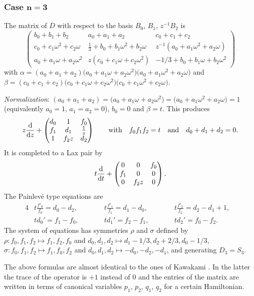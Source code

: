 \documentclass[10pt,a4paper]{amsart}
\numberwithin{equation}{section}
\begin{document}
\subsubsection[Case n=3]{Case $\boldsymbol{n=3}$}
The matrix of $D$ with respect to the basis $B_0$, $B_1$, $z^{-1}B_2$ is
\[\begin{pmatrix} b_0+b_1+b_2 & a_0+a_1+a_2 & c_0+c_1+c_2 \\
 c_0+c_1\omega ^2 +c_2\omega &\frac{1}{3}+b_0+b_1\omega^2+b_2\omega
 & z^{-1}(a_0+a_1\omega^2+a_2\omega ) \\
a_0+a_1\omega+a_2\omega^2 & z(c_0+c_1\omega+c_2\omega ^2)& -1/3+b_0+b_1\omega +b_2\omega^2
\end{pmatrix} \]
with $\alpha =(a_0+a_1+a_2)\bigl(a_0+a_1\omega +a_2\omega ^2\bigr)\bigl(a_0+a_1\omega^2+a_2\omega\bigr)$ and
 $\beta=(c_0+c_1+c_2)\bigl(c_0+c_1\omega +c_2\omega ^2\bigr)\bigl(c_0+c_1\omega^2+c_2\omega\bigr)$.

 {\it Normalization}: $(a_0+a_1+a_2)=\bigl(a_0+a_1\omega +a_2\omega ^2\bigr)=\bigl(a_0+a_1\omega^2+a_2\omega\bigr)=1$ (equivalently $a_0=1$, $a_1=a_2=0$), $b_0=0$ and $\beta=t$.
This produces
\[z\frac{{\rm d}}{{\rm d}z}+\begin{pmatrix}d_0 &1& f_0\\ f_1&d_1 & \frac{1}{z}\\ 1 &f_2z &d_2\end{pmatrix} \qquad\text{with}\quad f_0f_1f_2=t\quad\text{and}\quad d_0+d_1+d_2=0.\]
 It is completed to a Lax pair by
\[
t\frac{{\rm d}}{{\rm d}t}+\begin{pmatrix}0 &0& f_0\\ f_1&0 &0 \\ 0 & f_2z&0 \end{pmatrix}.
\]
The Painlev\'e type equations are
\begin{alignat*}{4}
& t\frac{f'_0}{f_0}= d_0-d_2 ,\qquad&&  t\frac{f'_1}{f_1}=d_1-d_0 ,\qquad && t\frac{f'_2}{f_2}=d_2-d_1+1 ,& \\
& td_0'=f_1-f_0,\qquad && td_1'=f_2-f_1,\qquad && td_2'=f_0-f_2.&
\end{alignat*}
 The system of equations has symmetries $\rho$ and $\sigma$ defined by
$\rho\colon f_0,f_1,f_2 \mapsto f_1,f_2,f_0$ and $d_0,d_1,d_2 \mapsto d_1-1/3, d_2+2/3, d_0-1/3$,
$\sigma\colon f_0,f_1,f_2\mapsto f_1,f_0,f_2$ and $d_0,d_1,d_2 \mapsto -d_0,-d_2,-d_1$,
and generating $D_3=S_3$.

The above formulas are almost identical to the ones of Kawakami \cite[p.\ 35]{K3}. In the latter the
trace of the operator is $+1$ instead of $0$ and the entries of the matrix are written in terms of canonical variables
$p_1$, $p_2$, $q_1$, $q_2$ for a certain Hamiltonian.
\end{document}
